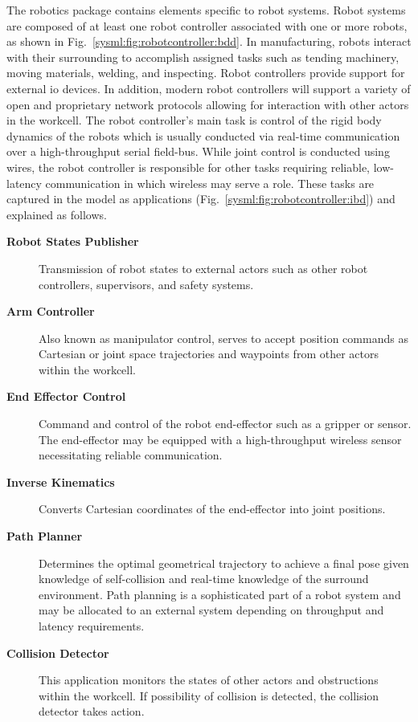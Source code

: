 The robotics package contains elements specific to robot systems.  Robot systems are composed of at least one robot controller associated with one or more robots, as shown in Fig.~\ref{sysml:fig:robotcontroller:bdd}.  In manufacturing, robots interact with their surrounding to accomplish assigned tasks such as tending machinery, moving materials, welding, and inspecting. Robot controllers provide support for external \gls{io} devices.  In addition, modern robot controllers will support a variety of open and proprietary network protocols allowing for interaction with other actors in the workcell.  The robot controller's main task is control of the rigid body dynamics of the robots which is usually conducted via real-time communication over a high-throughput serial field-bus. While joint control is conducted using wires, the robot controller is responsible for other tasks requiring reliable, low-latency communication in which wireless may serve a role.  These tasks are captured in the model as applications (Fig.~\ref{sysml:fig:robotcontroller:ibd}) and explained as follows.

\begin{description}
	
	\item[\textbf{Robot States Publisher}] Transmission of robot states to external actors such as other robot controllers, supervisors, and safety systems.
	
	\item[\textbf{Arm Controller}] Also known as manipulator control, serves to accept position commands as Cartesian or joint space trajectories and waypoints from other actors within the workcell.
	
	\item[\textbf{End Effector Control}] Command and control of the robot end-effector such as a gripper or sensor.  The end-effector may be equipped with a high-throughput wireless sensor necessitating reliable communication.
	
	\item[\textbf{Inverse Kinematics}] Converts Cartesian coordinates of the end-effector into joint positions.
	
	\item[\textbf{Path Planner}] Determines the optimal geometrical trajectory to achieve a final pose given knowledge of self-collision and real-time knowledge of the surround environment.  Path planning is a sophisticated part of a robot system and may be allocated to an external system depending on throughput and latency requirements.
	
	\item[\textbf{Collision Detector}] This application monitors the states of other actors and obstructions within the workcell. If possibility of collision is detected, the collision detector takes action.
	
\end{description} 

